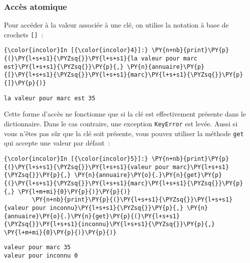     \hypertarget{accuxe8s-atomique}{%
\subsubsection{Accès atomique}\label{accuxe8s-atomique}}

    Pour accéder à la valeur associée à une clé, on utilise la notation à
base de crochets \texttt{{[}{]}}~:

    \begin{Verbatim}[commandchars=\\\{\}]
{\color{incolor}In [{\color{incolor}4}]:} \PY{n+nb}{print}\PY{p}{(}\PY{l+s+s1}{\PYZsq{}}\PY{l+s+s1}{la valeur pour marc est}\PY{l+s+s1}{\PYZsq{}}\PY{p}{,} \PY{n}{annuaire}\PY{p}{[}\PY{l+s+s1}{\PYZsq{}}\PY{l+s+s1}{marc}\PY{l+s+s1}{\PYZsq{}}\PY{p}{]}\PY{p}{)}
\end{Verbatim}


    \begin{Verbatim}[commandchars=\\\{\}]
la valeur pour marc est 35

    \end{Verbatim}

    Cette forme d'accès ne fonctionne que si la clé est effectivement
présente dans le dictionnaire. Dans le cas contraire, une exception
\texttt{KeyError} est levée. Aussi si vous n'êtes pas sûr que la clé
soit présente, vous pouvez utiliser la méthode \texttt{get} qui accepte
une valeur par défaut~:

    \begin{Verbatim}[commandchars=\\\{\}]
{\color{incolor}In [{\color{incolor}5}]:} \PY{n+nb}{print}\PY{p}{(}\PY{l+s+s1}{\PYZsq{}}\PY{l+s+s1}{valeur pour marc}\PY{l+s+s1}{\PYZsq{}}\PY{p}{,} \PY{n}{annuaire}\PY{o}{.}\PY{n}{get}\PY{p}{(}\PY{l+s+s1}{\PYZsq{}}\PY{l+s+s1}{marc}\PY{l+s+s1}{\PYZsq{}}\PY{p}{,} \PY{l+m+mi}{0}\PY{p}{)}\PY{p}{)}
        \PY{n+nb}{print}\PY{p}{(}\PY{l+s+s1}{\PYZsq{}}\PY{l+s+s1}{valeur pour inconnu}\PY{l+s+s1}{\PYZsq{}}\PY{p}{,} \PY{n}{annuaire}\PY{o}{.}\PY{n}{get}\PY{p}{(}\PY{l+s+s1}{\PYZsq{}}\PY{l+s+s1}{inconnu}\PY{l+s+s1}{\PYZsq{}}\PY{p}{,} \PY{l+m+mi}{0}\PY{p}{)}\PY{p}{)}
\end{Verbatim}


    \begin{Verbatim}[commandchars=\\\{\}]
valeur pour marc 35
valeur pour inconnu 0

    \end{Verbatim}

